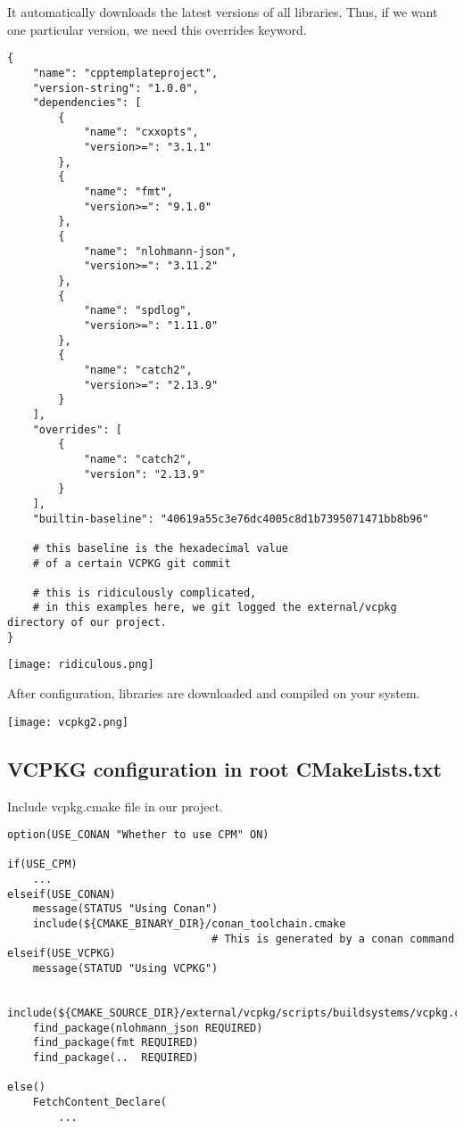 It automatically downloads the latest versions of all libraries. Thus, if we want one particular
version, we need this overrides keyword.

\begin{verbatim}
{
    "name": "cpptemplateproject",
    "version-string": "1.0.0",
    "dependencies": [
        {
            "name": "cxxopts",
            "version>=": "3.1.1"
        },
        {
            "name": "fmt",
            "version>=": "9.1.0"
        },
        {
            "name": "nlohmann-json",
            "version>=": "3.11.2"
        },
        {
            "name": "spdlog",
            "version>=": "1.11.0"
        },
        {
            "name": "catch2",
            "version>=": "2.13.9"
        }
    ],
    "overrides": [
        {
            "name": "catch2",
            "version": "2.13.9"
        }
    ],
    "builtin-baseline": "40619a55c3e76dc4005c8d1b7395071471bb8b96"

    # this baseline is the hexadecimal value
    # of a certain VCPKG git commit

    # this is ridiculously complicated,
    # in this examples here, we git logged the external/vcpkg directory of our project.
}
\end{verbatim}


\begin{center}
    \texttt{[image: ridiculous.png]}
\end{center}


After configuration, libraries are downloaded and compiled on your system.


\begin{center}
    \texttt{[image: vcpkg2.png]}
\end{center}


\subsection{VCPKG configuration in root CMakeLists.txt}

Include vcpkg.cmake file in our project.

\begin{verbatim}
option(USE_CONAN "Whether to use CPM" ON)

if(USE_CPM)
    ...
elseif(USE_CONAN)
    message(STATUS "Using Conan")
    include(${CMAKE_BINARY_DIR}/conan_toolchain.cmake  
                                # This is generated by a conan command
elseif(USE_VCPKG)
    message(STATUD "Using VCPKG")

    include(${CMAKE_SOURCE_DIR}/external/vcpkg/scripts/buildsystems/vcpkg.cmake)
    find_package(nlohmann_json REQUIRED)
    find_package(fmt REQUIRED)
    find_package(..  REQUIRED)

else()
    FetchContent_Declare(
        ...
\end{verbatim}

